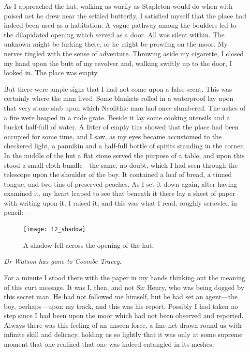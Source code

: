 \documentclass[paper=5.5in:8.5in,BCOR=7mm,twoside,DIV=calc,12pt,usegeometry,openany,chapterprefix,endperiod]{scrbook} %
\begin{document}
As I approached the hut, walking as warily as Stapleton would do when with poised net he drew near the settled butterfly, I satisfied myself that the place had indeed been used as a habitation. A vague pathway among the boulders led to the dilapidated opening which served as a door. All was silent within. The unknown might be lurking there, or he might be prowling on the moor. My nerves tingled with the sense of adventure. Throwing aside my cigarette, I closed my hand upon the butt of my revolver and, walking swiftly up to the door, I looked in. The place was empty.

But there were ample signs that I had not come upon a false scent. This was certainly where the man lived. Some blankets rolled in a waterproof lay upon that very stone slab upon which Neolithic man had once slumbered. The ashes of a fire were \newline heaped in a rude grate. Beside it lay some cooking utensils and a bucket half-full of water. A litter of empty tins showed that the place had been occupied for some time, and I saw, as my eyes became accustomed to the checkered light, a pannikin and a half-full bottle of spirits standing in the corner. In the middle of the hut a flat stone served the purpose of a table, and upon this stood a small cloth bundle\nobreakdash---the same, no doubt, which I had seen through the telescope upon the shoulder of the boy. It contained a loaf of bread, a tinned tongue, and two tins of preserved peaches. As I set it down again, after having examined it, my heart leaped to see that beneath it there lay a sheet of paper with writing upon it. I raised it, and this was what I read, roughly scrawled in pencil:\nobreakdash--- 

\begin{figure}[p]
\centering
\texttt{[image: 12\_shadow]}
\caption{A shadow fell across the opening of the hut.}
\end{figure}

\textit{Dr Watson has gone to Coombe Tracey.}

For a minute I stood there with the paper in my hands thinking out the meaning of this curt message. It was I, then, and not Sir Henry, who was being dogged by this secret man. He had not followed me himself, but he had set an agent\nobreakdash---the boy, perhaps\nobreakdash---upon my track, and this was his report. Possibly I had taken no step since I had been upon the moor which had not been observed and reported. Always there was this feeling of an unseen force, a fine net drawn round us with infinite skill and delicacy, holding us so lightly that it was only at some supreme moment that one realized that one was indeed entangled in its meshes.
\end{document}
